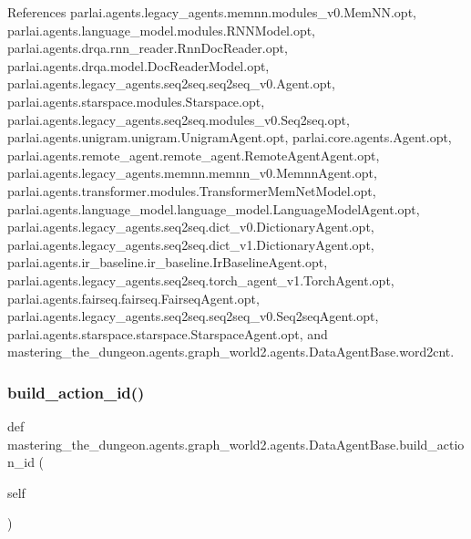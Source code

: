 References parlai.\+agents.\+legacy\+\_\+agents.\+memnn.\+modules\+\_\+v0.\+Mem\+N\+N.\+opt, parlai.\+agents.\+language\+\_\+model.\+modules.\+R\+N\+N\+Model.\+opt, parlai.\+agents.\+drqa.\+rnn\+\_\+reader.\+Rnn\+Doc\+Reader.\+opt, parlai.\+agents.\+drqa.\+model.\+Doc\+Reader\+Model.\+opt, parlai.\+agents.\+legacy\+\_\+agents.\+seq2seq.\+seq2seq\+\_\+v0.\+Agent.\+opt, parlai.\+agents.\+starspace.\+modules.\+Starspace.\+opt, parlai.\+agents.\+legacy\+\_\+agents.\+seq2seq.\+modules\+\_\+v0.\+Seq2seq.\+opt, parlai.\+agents.\+unigram.\+unigram.\+Unigram\+Agent.\+opt, parlai.\+core.\+agents.\+Agent.\+opt, parlai.\+agents.\+remote\+\_\+agent.\+remote\+\_\+agent.\+Remote\+Agent\+Agent.\+opt, parlai.\+agents.\+legacy\+\_\+agents.\+memnn.\+memnn\+\_\+v0.\+Memnn\+Agent.\+opt, parlai.\+agents.\+transformer.\+modules.\+Transformer\+Mem\+Net\+Model.\+opt, parlai.\+agents.\+language\+\_\+model.\+language\+\_\+model.\+Language\+Model\+Agent.\+opt, parlai.\+agents.\+legacy\+\_\+agents.\+seq2seq.\+dict\+\_\+v0.\+Dictionary\+Agent.\+opt, parlai.\+agents.\+legacy\+\_\+agents.\+seq2seq.\+dict\+\_\+v1.\+Dictionary\+Agent.\+opt, parlai.\+agents.\+ir\+\_\+baseline.\+ir\+\_\+baseline.\+Ir\+Baseline\+Agent.\+opt, parlai.\+agents.\+legacy\+\_\+agents.\+seq2seq.\+torch\+\_\+agent\+\_\+v1.\+Torch\+Agent.\+opt, parlai.\+agents.\+fairseq.\+fairseq.\+Fairseq\+Agent.\+opt, parlai.\+agents.\+legacy\+\_\+agents.\+seq2seq.\+seq2seq\+\_\+v0.\+Seq2seq\+Agent.\+opt, parlai.\+agents.\+starspace.\+starspace.\+Starspace\+Agent.\+opt, and mastering\+\_\+the\+\_\+dungeon.\+agents.\+graph\+\_\+world2.\+agents.\+Data\+Agent\+Base.\+word2cnt.

\mbox{\label{classmastering__the__dungeon_1_1agents_1_1graph__world2_1_1agents_1_1DataAgentBase_add9ea9762bf098cda7e179bc7c19cf6d}} 
\subsubsection{\texorpdfstring{build\+\_\+action\+\_\+id()}{build\_action\_id()}}
{\footnotesize\ttfamily def mastering\+\_\+the\+\_\+dungeon.\+agents.\+graph\+\_\+world2.\+agents.\+Data\+Agent\+Base.\+build\+\_\+action\+\_\+id (\begin{DoxyParamCaption}\item[{}]{self }\end{DoxyParamCaption})}



